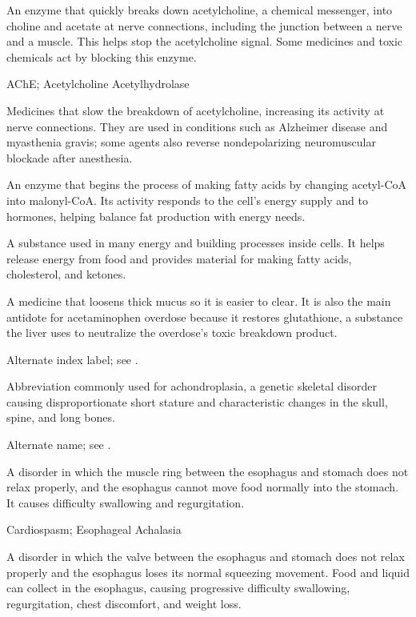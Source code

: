  An enzyme that quickly breaks down
acetylcholine, a chemical messenger, into choline and acetate at nerve
connections, including the junction between a nerve and a muscle. This helps
stop the acetylcholine signal. Some medicines and toxic chemicals act by
blocking this enzyme.

\synonyms
AChE; Acetylcholine Acetylhydrolase

 Medicines that slow the breakdown of acetylcholine, increasing its activity at nerve connections. They are used in conditions such as Alzheimer disease and myasthenia gravis; some agents also reverse nondepolarizing neuromuscular blockade after anesthesia.

 An enzyme that begins the process of making fatty acids by changing acetyl-CoA into malonyl-CoA. Its activity responds to the cell’s energy supply and to hormones, helping balance fat production with energy needs.

 A substance used in many energy and building processes inside cells. It helps release energy from food and provides material for making fatty acids, cholesterol, and ketones.

 A medicine that loosens thick mucus so it is easier to clear. It is also the main antidote for acetaminophen overdose because it restores glutathione, a substance the liver uses to neutralize the overdose’s toxic breakdown product.

 Alternate index label; see .

 Abbreviation commonly used for achondroplasia, a genetic skeletal disorder causing disproportionate short stature and characteristic changes in the skull, spine, and long bones.

 Alternate name; see .

 A disorder in which the muscle ring between the esophagus and stomach does not relax properly, and the esophagus cannot move food normally into the stomach. It causes difficulty swallowing and regurgitation.

\synonyms
Cardiospasm; Esophageal Achalasia

 A disorder in which the valve between the esophagus and stomach does not relax properly and the esophagus loses its normal squeezing movement. Food and liquid can collect in the esophagus, causing progressive difficulty swallowing, regurgitation, chest discomfort, and weight loss.

